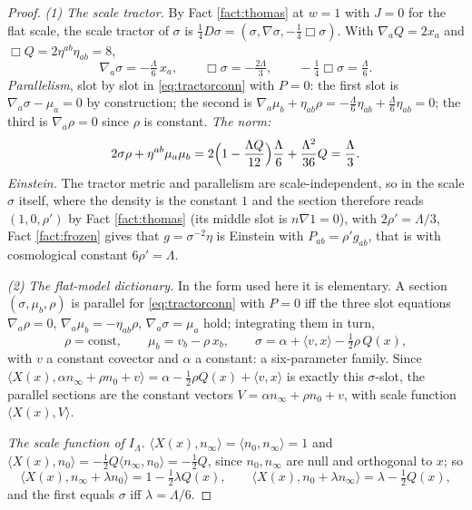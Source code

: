 \documentclass[11pt]{article}
\theoremstyle{definition}
\newcommand{\ip}[2]{\langle #1, #2\rangle}
\begin{document}
\begin{proof}
\emph{(1) The scale tractor.} By Fact \ref{fact:thomas} at $w = 1$ with $J = 0$ for the flat scale, the scale tractor of $\sigma$ is $\tfrac14 D\sigma = (\sigma, \nabla\sigma, -\tfrac14\Box\sigma)$. With $\nabla_{a}Q = 2x_{a}$ and $\Box Q = 2\eta^{ab}\eta_{ab} = 8$,
\[
\nabla_{a}\sigma = -\tfrac{\Lambda}{6}\,x_{a}, \qquad \Box\sigma = -\tfrac{2\Lambda}{3}, \qquad -\tfrac14\Box\sigma = \tfrac{\Lambda}{6}.
\]
\emph{Parallelism}, slot by slot in \eqref{eq:tractorconn} with $P = 0$: the first slot is $\nabla_{a}\sigma - \mu_{a} = 0$ by construction; the second is $\nabla_{a}\mu_{b} + \eta_{ab}\rho = -\tfrac{\Lambda}{6}\eta_{ab} + \tfrac{\Lambda}{6}\eta_{ab} = 0$; the third is $\nabla_{a}\rho = 0$ since $\rho$ is constant. \emph{The norm:}
\[
2\sigma\rho + \eta^{ab}\mu_{a}\mu_{b} = 2\Bigl(1 - \frac{\Lambda Q}{12}\Bigr)\frac{\Lambda}{6} + \frac{\Lambda^{2}}{36}Q = \frac{\Lambda}{3}.
\]
\emph{Einstein.} The tractor metric and parallelism are scale-independent, so in the scale $\sigma$ itself, where the density is the constant $1$ and the section therefore reads $(1, 0, \rho')$ by Fact \ref{fact:thomas} (its middle slot is $n\nabla 1 = 0$), with $2\rho' = \Lambda/3$, Fact \ref{fact:frozen} gives that $g = \sigma^{-2}\eta$ is Einstein with $P_{ab} = \rho' g_{ab}$, that is with cosmological constant $6\rho' = \Lambda$.

\emph{(2) The flat-model dictionary.} In the form used here it is elementary. A section $(\sigma, \mu_{b}, \rho)$ is parallel for \eqref{eq:tractorconn} with $P = 0$ iff the three slot equations $\nabla_{a}\rho = 0$, $\nabla_{a}\mu_{b} = -\eta_{ab}\rho$, $\nabla_{a}\sigma = \mu_{a}$ hold; integrating them in turn,
\[
\rho = \text{const}, \qquad \mu_{b} = v_{b} - \rho\, x_{b}, \qquad \sigma = \alpha + \ip{v}{x} - \tfrac12\rho\, Q(x),
\]
with $v$ a constant covector and $\alpha$ a constant: a six-parameter family. Since $\ip{X(x)}{\alpha n_{\infty} + \rho n_{0} + v} = \alpha - \tfrac12\rho Q(x) + \ip{v}{x}$ is exactly this $\sigma$-slot, the parallel sections are the constant vectors $V = \alpha n_{\infty} + \rho n_{0} + v$, with scale function $\ip{X(x)}{V}$.

\emph{The scale function of $I_{\Lambda}$.} $\ip{X(x)}{n_{\infty}} = \ip{n_{0}}{n_{\infty}} = 1$ and $\ip{X(x)}{n_{0}} = -\tfrac12 Q\ip{n_{\infty}}{n_{0}} = -\tfrac12 Q$, since $n_{0}, n_{\infty}$ are null and orthogonal to $x$; so
\[
\ip{X(x)}{n_{\infty} + \lambda n_{0}} = 1 - \tfrac12\lambda Q(x), \qquad \ip{X(x)}{n_{0} + \lambda n_{\infty}} = \lambda - \tfrac12 Q(x),
\]
and the first equals $\sigma$ iff $\lambda = \Lambda/6$.


\end{proof}
\end{document}
